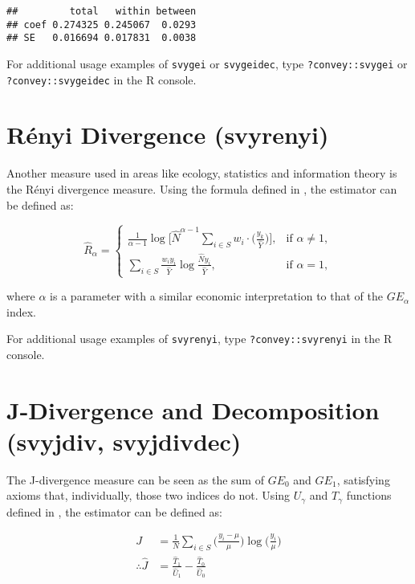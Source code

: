 \documentclass[]{book}
\begin{document}
\begin{verbatim}
##         total   within between
## coef 0.274325 0.245067  0.0293
## SE   0.016694 0.017831  0.0038
\end{verbatim}

For additional usage examples of \texttt{svygei} or \texttt{svygeidec}, type \texttt{?convey::svygei} or \texttt{?convey::svygeidec} in the R console.

\hypertarget{ruxe9nyi-divergence-svyrenyi}{%
\section{Rényi Divergence (svyrenyi)}\label{ruxe9nyi-divergence-svyrenyi}}

Another measure used in areas like ecology, statistics and information theory is the Rényi divergence measure. Using the formula defined in \citet{langel2012}, the estimator can be defined as:

\[
\widehat{R}_\alpha =
\begin{cases}
\frac{1}{\alpha - 1} \log \bigg[ \widehat{N}^{\alpha - 1} \sum_{i \in S} w_i \cdot \bigg( \frac{y_k}{ \widehat{Y} } \bigg) \bigg], &\text{if } \alpha \neq 1, \\
\sum_{i \in S} \frac{w_i y_i}{ \widehat{Y}} \log \frac{\widehat{N} y_i}{\widehat{Y}}, &\text{if } \alpha = 1,
\end{cases}
\]

where \(\alpha\) is a parameter with a similar economic interpretation to that of the \(GE_\alpha\) index.

For additional usage examples of \texttt{svyrenyi}, type \texttt{?convey::svyrenyi} in the R console.

\hypertarget{j-divergence-and-decomposition-svyjdiv-svyjdivdec}{%
\section{J-Divergence and Decomposition (svyjdiv, svyjdivdec)}\label{j-divergence-and-decomposition-svyjdiv-svyjdivdec}}

The J-divergence measure \citep{rohde2016} can be seen as the sum of \(GE_0\) and \(GE_1\), satisfying axioms that, individually, those two indices do not. Using \(U_\gamma\) and \(T_\gamma\) functions defined in \citet{biewen2003}, the estimator can be defined as:

\[
\begin{aligned}
J &= \frac{1}{N} \sum_{i \in S} \bigg( \frac{ y_i - \mu }{ \mu } \bigg) \log \bigg( \frac{y_i}{\mu} \bigg) \\
\therefore \widehat{J} &= \frac{\widehat{T}_1}{\widehat{U}_1} - \frac{ \widehat{T}_0 }{ \widehat{U}_0 }
\end{aligned}
\]
\end{document}
